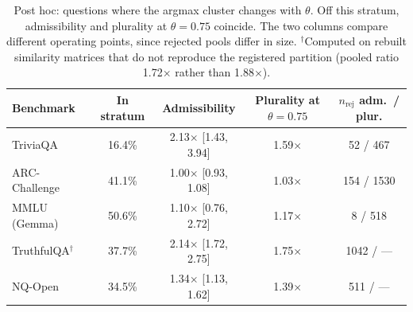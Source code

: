 \begin{table}[h]
\centering
\footnotesize
\setlength{\tabcolsep}{4pt}
\begin{tabular}{lcccc}
\toprule
Benchmark & In stratum & Admissibility & Plurality at $\theta=0.75$ & $n_{\text{rej}}$ adm.\ / plur. \\
\midrule
TriviaQA & 16.4\% & 2.13$\times$ [1.43, 3.94] & 1.59$\times$ & 52 / 467 \\
ARC-Challenge & 41.1\% & 1.00$\times$ [0.93, 1.08] & 1.03$\times$ & 154 / 1530 \\
MMLU (Gemma) & 50.6\% & 1.10$\times$ [0.76, 2.72] & 1.17$\times$ & 8 / 518 \\
TruthfulQA$^\dagger$ & 37.7\% & 2.14$\times$ [1.72, 2.75] & 1.75$\times$ & 1042 / --- \\
NQ-Open & 34.5\% & 1.34$\times$ [1.13, 1.62] & 1.39$\times$ & 511 / --- \\
\bottomrule
\end{tabular}
\caption{Post hoc: questions where the argmax cluster changes with $\theta$. Off this stratum, admissibility and plurality at $\theta=0.75$ coincide. The two columns compare different operating points, since rejected pools differ in size. $^\dagger$Computed on rebuilt similarity matrices that do not reproduce the registered partition (pooled ratio 1.72$\times$ rather than 1.88$\times$).}
\label{tab:multi-argmax}
\end{table}
